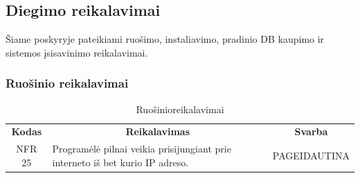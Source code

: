\documentclass{VUMIFPSkursinis}
\begin{document}
\pagebreak

\subsection{Diegimo reikalavimai}
Šiame poskyryje pateikiami ruošimo, instaliavimo, pradinio DB kaupimo ir sistemos įsisavinimo reikalavimai.
\subsubsection{Ruošinio reikalavimai}
\begin{center}
	\begin{table}[H]
	\caption{Ruošinioreikalavimai}
	\begin{tabular}{|p{2cm}|p{}|p{}|}
	\hline
	    \rowcolor{lightgray}
		\multicolumn{3}{|c|}{Ruošinio reikalavimai}\\
		
	\hline
		\multicolumn{1}{|c|}{{\bfseries Kodas}}&
		\multicolumn{1}{|c|}{{\bfseries Reikalavimas}}&
		\multicolumn{1}{|c|}{{\bfseries Svarba}}\\
	\hline 	
		\multicolumn{1}{|c|}{NFR 25}&
		{Programėlė pilnai veikia prisijungiant prie interneto iš bet kurio IP adreso.}&
		\multicolumn{1}{|p{1.5cm}|}{PAGEIDAUTINA}\\	
	
	\hline
	
	
	\end{tabular}
	
	\label{table:Ruošinioreikalavimai}
	\end{table}

\end{center}
\end{document}
